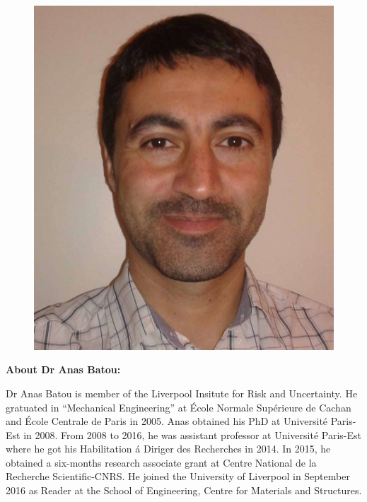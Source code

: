 \documentclass[11pt]{article}%
\begin{document}
\begin{minipage}[!t]{.25\linewidth}
\begin{mdframed}[style=about,frametitle={}] %

\begin{figure}[H]
\includegraphics[width=1\linewidth]{anas/photo_cLR_cropped.jpg}
\end{figure}

\vspace{-10pt}

{\textbf{\large About Dr Anas Batou:}}

\begin{scriptsize}
Dr Anas Batou is member of the Liverpool Insitute for Risk and Uncertainty. He gratuated in “Mechanical Engineering” at {\'E}cole Normale Sup{\'e}rieure de Cachan and {\'E}cole Centrale de Paris in 2005. Anas obtained his PhD  at Université Paris-Est in 2008. From 2008 to 2016, he was assistant professor at Université Paris-Est where he got his Habilitation {\'a} Diriger des Recherches in 2014. In 2015, he obtained a six-months  research associate grant at Centre National de la Recherche Scientific-CNRS. He joined the University of Liverpool in September 2016 as Reader at the School of Engineering, Centre for Materials and Structures.


\end{scriptsize}
\end{mdframed}
\end{minipage}
\end{document}
